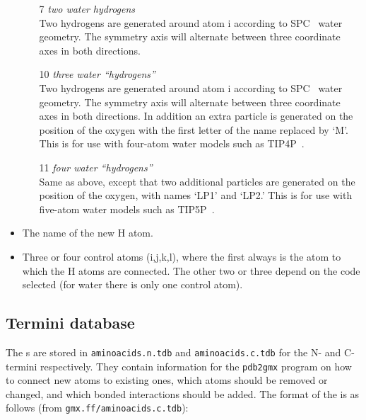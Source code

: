 \begin{itemize}
\begin{enumerate}
\item[7]{\em two water hydrogens}\\
Two hydrogens are generated around atom i according to
SPC~\cite{Berendsen81} water geometry. The symmetry axis will
alternate between three coordinate axes in both directions.

\item[10]{\em three water ``hydrogens''}\\
Two hydrogens are generated around atom i according to
SPC~\cite{Berendsen81} water geometry. The symmetry axis will
alternate between three coordinate axes in both directions. In addition
an extra particle is generated on the position of the oxygen with
the first letter of the name replaced by `M'. This is for
use with four-atom water models such as TIP4P~\cite{Jorgensen83}.

\item[11]{\em four water ``hydrogens''}\\
Same as above, except that two additional
particles are generated on the position of the oxygen, with names
`LP1' and `LP2.' This is for
use with five-atom water models such as TIP5P~\cite{Mahoney2000a}.
\end{enumerate}

\item
The name of the new H atom.

\item
Three or four control atoms (i,j,k,l), where the first always is the
atom to which the H atoms are connected. The other two or three depend
on the code selected (for water there is only one control atom).
\end{itemize}

\subsection{Termini database}
\label{subsec:tdb}
The s are stored in {\tt aminoacids.n.tdb} and
{\tt aminoacids.c.tdb} for the N- and C-termini respectively. They contain
information for the {\tt pdb2gmx} program on how to connect new atoms
to existing ones, which atoms should be removed or changed, and which
bonded interactions should be added. The format of the is as follows
(from {\tt gmx.ff/aminoacids.c.tdb}):

